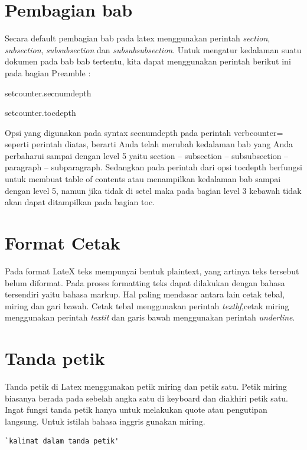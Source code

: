 \section{Pembagian bab}
Secara default pembagian bab pada latex menggunakan perintah \textit{section}, \textit{subsection}, \textit{subsubsection} dan \textit{subsubsubsection}. Untuk mengatur kedalaman suatu dokumen pada bab bab tertentu, kita dapat menggunakan perintah berikut ini pada bagian Preamble :



setcounter.secnumdepth


setcounter.tocdepth

Opsi yang digunakan pada syntax secnumdepth pada perintah verbcounter= seperti perintah diatas, berarti Anda telah merubah kedalaman bab yang Anda perbaharui sampai dengan level 5 yaitu section -- subsection -- subsubsection -- paragraph -- subparagraph. Sedangkan pada perintah dari opsi tocdepth berfungsi untuk membuat table of contents atau menampilkan kedalaman bab sampai dengan level 5, namun jika tidak di setel maka pada bagian level 3 kebawah tidak akan dapat ditampilkan pada bagian toc.


\section{Format Cetak}
Pada format LateX teks mempunyai bentuk plaintext, yang artinya teks tersebut belum diformat. Pada proses formatting teks dapat dilakukan dengan bahasa tersendiri yaitu bahasa markup. Hal paling mendasar antara lain cetak tebal, miring dan gari bawah. Cetak tebal menggunakan perintah \textit{textbf},cetak miring menggunakan perintah \textit{textit} dan garis bawah menggunakan perintah \textit{underline}.

\section{Tanda petik}
Tanda petik di Latex menggunakan petik miring dan petik satu. Petik miring biasanya berada pada sebelah angka satu di keyboard dan diakhiri petik satu. Ingat fungsi tanda petik hanya untuk melakukan quote atau pengutipan langsung. Untuk istilah bahasa inggris gunakan miring.

\begin{lstlisting}[caption=Contoh kalimat dalam tanda petik di Latex,label={lst:tandapetik}]
`kalimat dalam tanda petik'
\end{lstlisting}

